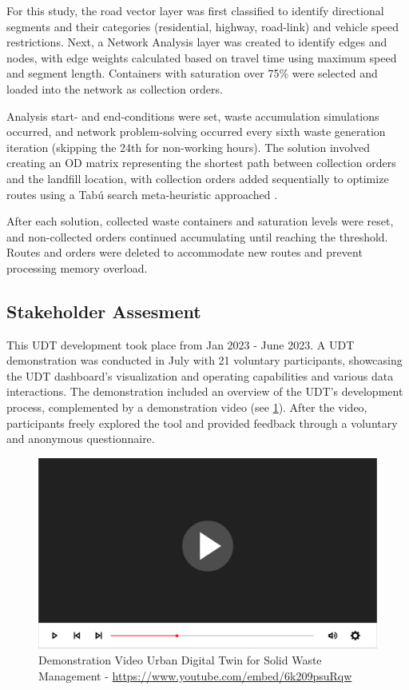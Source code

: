 \documentclass[authoryear,preprint,review,doubleblind, 12pt]{elsarticle}
\begin{document}
    For this study, the road vector layer was first classified to identify directional segments and their categories (residential, highway, road-link) and vehicle speed restrictions. Next, a Network Analysis layer was created to identify edges and nodes, with edge weights calculated based on travel time using maximum speed and segment length. Containers with saturation over 75\% were selected and loaded into the network as collection orders.

    Analysis start- and end-conditions were set, waste accumulation simulations occurred, and network problem-solving occurred every sixth waste generation iteration (skipping the 24th for non-working hours). The solution involved creating an OD matrix representing the shortest path between collection orders and the landfill location, with collection orders added sequentially to optimize routes using a Tabú search meta-heuristic approached \citep{ESRI2023c}.

    After each solution, collected waste containers and saturation levels were reset, and non-collected orders continued accumulating until reaching the threshold. Routes and orders were deleted to accommodate new routes and prevent processing memory overload.

    \subsection{Stakeholder Assesment} \label{sub:MethAssesment}

    This UDT development took place from Jan 2023 - June 2023. A UDT demonstration was conducted in July with 21 voluntary participants, showcasing the UDT dashboard's visualization and operating capabilities and various data interactions. The demonstration included an overview of the UDT's development process, complemented by a demonstration video (see \ref{fig:video}). After the video, participants freely explored the tool and provided feedback through a voluntary and anonymous questionnaire.

    \begin{figure}[!ht]
        \centering
        \includegraphics[width=\linewidth]{Figures/video.png}
        \caption{Demonstration Video Urban Digital Twin for Solid Waste Management - \href{https://www.youtube.com/embed/6k209psuRqw}{https://www.youtube.com/embed/6k209psuRqw}}
        \label{fig:video}
    \end{figure}
\end{document}
